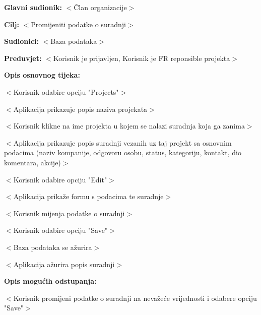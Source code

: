 					\noindent {}
					\begin{packed_item}

						\item \textbf{Glavni sudionik:} $<$Član organizacije$>$
						\item \textbf{Cilj:} $<$Promijeniti podatke o suradnji$>$
						\item \textbf{Sudionici:} $<$Baza podataka$>$
						\item \textbf{Preduvjet:} $<$Korisnik je prijavljen, Korisnik je FR reponsible projekta$>$
						\item \textbf{Opis osnovnog tijeka:}

						\item[] \begin{packed_enum}

							\item $<$Korisnik odabire opciju "Projects"$>$
							\item $<$Aplikacija prikazuje popis naziva projekata$>$
							\item $<$Korisnik klikne na ime projekta u kojem se nalazi suradnja koja ga zanima$>$
							\item $<$Aplikacija prikazuje popis suradnji vezanih uz taj projekt sa osnovnim podacima (naziv kompanije, odgovoru osobu, status, kategoriju, kontakt, dio komentara, akcije)$>$
							\item $<$Korisnik odabire opciju "Edit"$>$
							\item $<$Aplikacija prikaže formu s podacima te suradnje$>$
							\item $<$Korisnik mijenja podatke o suradnji$>$
							\item $<$Korisnik odabire opciju "Save"$>$
							\item $<$Baza podataka se ažurira$>$
							\item $<$Aplikacija ažurira popis suradnji$>$

						\end{packed_enum}
						
						\item \textbf{Opis mogućih odstupanja:}

						\item[] \begin{packed_item}

							\item[1.9.b, 2.7.b] $<$Korisnik promijeni podatke o suradnji na nevažeće vrijednosti
							i odabere opciju "Save"$>$
							

\end{packed_item}
\end{packed_item}
